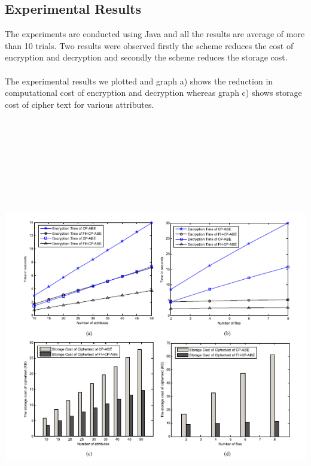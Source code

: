 \documentclass[a4paper,12pt]{article}
\begin{document}
\subsection{Experimental Results}
The experiments are conducted using Java and all the results are average of more than 10 trials.
Two results were observed firstly the scheme reduces the cost of encryption and decryption and secondly the scheme reduces the storage cost.\\ \\
The experimental results we plotted and graph a) shows the reduction in computational cost of encryption and decryption whereas graph c) shows storage cost of cipher text for various attributes.\\
\includegraphics[width=19cm,height=20cm]{fig17.PNG}
\newpage
\end{document}
